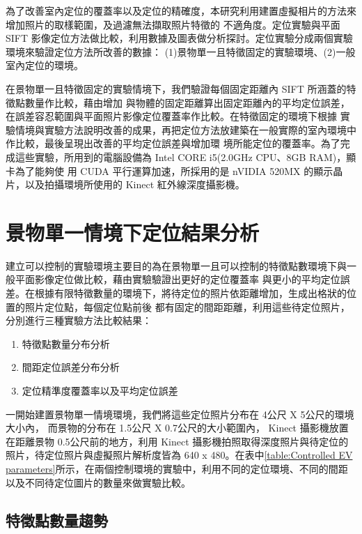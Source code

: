 %
	為了改善室內定位的覆蓋率以及定位的精確度，本研究利用建置虛擬相片的方法來增加照片的取樣範圍，及過濾無法擷取照片特徵的
不適角度。定位實驗與平面 SIFT 影像定位方法做比較，利用數據及圖表做分析探討。定位實驗分成兩個實驗環境來驗證定位方法所改善的數據：
(1)景物單一且特徵固定的實驗環境、(2)一般室內定位的環境。

	在景物單一且特徵固定的實驗情境下，我們驗證每個固定距離內 SIFT 所涵蓋的特徵點數量作比較，藉由增加
與物體的固定距離算出固定距離內的平均定位誤差，在誤差容忍範圍與平面照片影像定位覆蓋率作比較。在特徵固定的環境下根據
實驗情境與實驗方法說明改善的成果，再把定位方法放建築在一般實際的室內環境中作比較，最後呈現出改善的平均定位誤差與增加環
境所能定位的覆蓋率。為了完成這些實驗，所用到的電腦設備為 Intel CORE i5(2.0GHz CPU、8GB RAM)，顯卡為了能夠使
用 CUDA 平行運算加速，所採用的是 nVIDIA 520MX 的顯示晶片，以及拍攝環境所使用的 Kinect 紅外線深度攝影機。

\section{景物單一情境下定位結果分析}

	建立可以控制的實驗環境主要目的為在景物單一且可以控制的特徵點數環境下與一般平面影像定位做比較，藉由實驗驗證出更好的定位覆蓋率
與更小的平均定位誤差。在根據有限特徵數量的環境下，將待定位的照片依距離增加，生成出格狀的位置的照片定位點，每個定位點前後
都有固定的間距距離，利用這些待定位照片，分別進行三種實驗方法比較結果：
							
\begin{enumerate}
  \item 特徵點數量分布分析
  \item 間距定位誤差分布分析
  \item 定位精準度覆蓋率以及平均定位誤差
\end{enumerate}


一開始建置景物單一情境環境，我們將這些定位照片分布在 4公尺 X 5公尺的環境大小內，
而景物的分布在 1.5公尺 X 0.7公尺的大小範圍內， Kinect 攝影機放置在距離景物 0.5公尺前的地方，利用 Kinect 攝影機拍照取得深度照片與待定位的照片，待定位照片與虛擬照片解析度皆為
640 x 480。在表中\ref{table:Controlled EV parameters}所示，在兩個控制環境的實驗中，利用不同的定位環境、不同的間距以及不同待定位圖片的數量來做實驗比較。
		
\subsection{特徵點數量趨勢}

